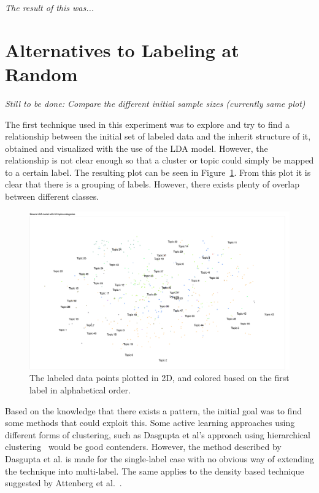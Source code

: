 \textit{The result of this was...}

\section{Alternatives to Labeling at Random}

\textit{Still to be done: Compare the different initial sample sizes (currently same plot)}

The first technique used in this experiment was to explore and try to find a relationship between the initial set of labeled data and the inherit structure of it, obtained and visualized with the use of the LDA model.
However, the relationship is not clear enough so that a cluster or topic could simply be mapped to a certain label.
The resulting plot can be seen in Figure~\ref{fig:categories-lda-50}.
From this plot it is clear that there is a grouping of labels.
However, there exists plenty of overlap between different classes.

\begin{figure}
    \centering
    \includegraphics[scale=0.35, angle=270]{figures/categories-lda-50.png}
    \caption{The labeled data points plotted in 2D, and colored based on the first label in alphabetical order.}
    \label{fig:categories-lda-50}
\end{figure}

Based on the knowledge that there exists a pattern, the initial goal was to find some methods that could exploit this.
Some active learning approaches using different forms of clustering, such as Dasgupta et al\@'s approach using hierarchical clustering~\cite{dasgupta2008hierarchical} would be good contenders.
However, the method described by Dasgupta et al\@. is made for the single-label case with no obvious way of extending the technique into multi-label.
The same applies to the density based technique suggested by Attenberg et al\@.~\cite{attenberg2013class}.

